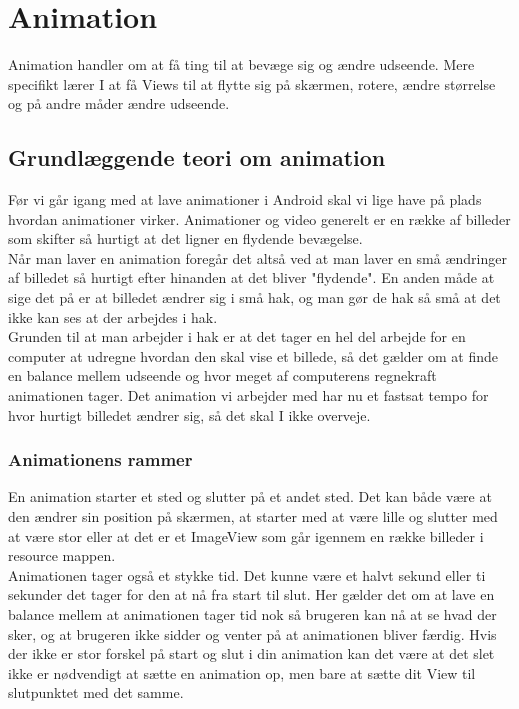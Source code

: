 
\chapter{Animation}
Animation handler om at få ting til at bevæge sig og ændre udseende. Mere specifikt lærer I at få Views til at flytte sig på skærmen, rotere, ændre størrelse og på andre måder ændre udseende.
\section{Grundlæggende teori om animation}
Før vi går igang med at lave animationer i Android skal vi lige have på plads hvordan animationer virker.
Animationer og video generelt er en række af billeder som skifter så hurtigt at det ligner en flydende bevægelse. \\
Når man laver en animation foregår det altså ved at man laver en små ændringer af billedet så hurtigt efter hinanden at det bliver "flydende". En anden måde at sige det på er at billedet ændrer sig i små hak, og man gør de hak så små at det ikke kan ses at der arbejdes i hak. \\
Grunden til at man arbejder i hak er at det tager en hel del arbejde for en computer  at udregne hvordan den skal vise et billede, så det gælder om at finde en balance mellem udseende og hvor meget af computerens regnekraft animationen tager. Det animation vi arbejder med har nu et fastsat tempo for hvor hurtigt billedet ændrer sig, så det skal I ikke overveje.
\subsection{Animationens rammer}
En animation starter et sted og slutter på et andet sted. Det kan både være at den ændrer sin position på skærmen, at starter med at være lille og slutter med at være stor eller at det er et ImageView som går igennem en række billeder i resource mappen. \\
Animationen tager også et stykke tid. Det kunne være et halvt sekund eller ti sekunder det tager for den at nå fra start til slut. Her gælder det om at lave en balance mellem at animationen tager tid nok så brugeren kan nå at se hvad der sker, og at brugeren ikke sidder og venter på at animationen bliver færdig. Hvis der ikke er stor forskel på start og slut i din animation kan det være at det slet ikke er nødvendigt at sætte en animation op, men bare at sætte dit View til slutpunktet med det samme.  \\

